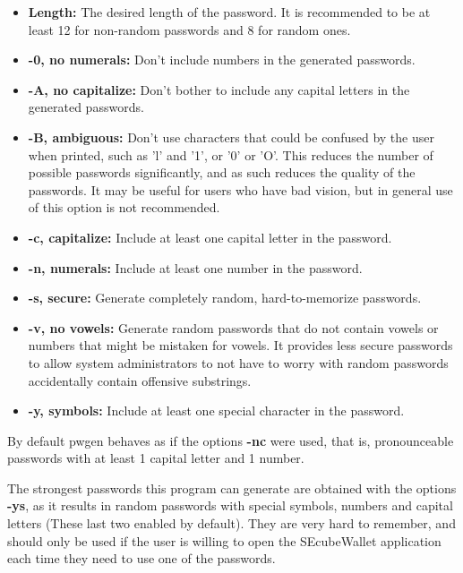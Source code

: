 \begin{itemize}
\setlength\itemsep{0pt}


\item \textbf{Length:} The desired length of the password. It is recommended to be at least 12 for non-random passwords and 8 for random ones.

\item \textbf{-0, no numerals:} 
Don't include numbers in the generated passwords. 

\item \textbf{-A, no capitalize:} 
Don't bother to include any capital letters in the generated passwords. 
    
\item \textbf{-B, ambiguous:}
Don't use characters that could be confused by the user when printed, such as 'l' and '1', or '0' or 'O'. This reduces the number of possible passwords significantly, and as such reduces the quality of the passwords. It may be useful for users who have bad vision, but in general use of this option is not recommended. 
    
\item \textbf{-c, capitalize:}
Include at least one capital letter in the password.

\item \textbf{-n, numerals:}
Include at least one number in the password.

\item \textbf{-s, secure:}
Generate completely random, hard-to-memorize passwords.

\item \textbf{-v, no vowels:}
Generate random passwords that do not contain vowels or numbers that might be mistaken for vowels. It provides less secure passwords to allow system administrators to not have to worry with random passwords accidentally contain offensive substrings. 

\item \textbf{-y, symbols:}
Include at least one special character in the password.
\end{itemize}

By default pwgen behaves as if the options \textbf{-nc} were used, that is, pronounceable passwords with at least 1 capital letter and 1 number.

The strongest passwords this program can generate are obtained with the options \textbf{-ys}, as it results in random passwords with special symbols, numbers and capital letters (These last two enabled by default). They are very hard to remember, and should only be used if the user is willing to open the SEcubeWallet application each time they need to use one of the passwords.


